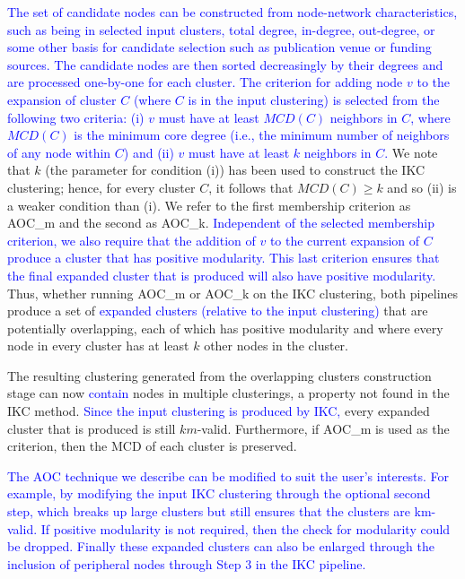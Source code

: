 \documentclass[12pt, oneside]{article}   	%
\begin{document}
\textcolor{blue}{The set of candidate nodes can be constructed from node-network characteristics, such as  being in selected  input clusters,  total degree, in-degree,  out-degree,  or some other basis for candidate selection such as publication venue or funding sources. The candidate nodes are then sorted decreasingly by their degrees and are processed one-by-one for each cluster.
The criterion for adding node $v$ to the expansion of cluster $C$ (where $C$ is in the input clustering) is selected from the following two criteria:
 (i) $v$ must have at least $MCD(C)$ neighbors in  $C$, 
where $MCD(C)$ is the minimum core degree (i.e., the minimum number of neighbors of any node within $C$)  and
(ii) $v$ must have at least $k$ neighbors in  $C$.}
 We note that $k$ (the parameter for condition (i)) has been used to construct the IKC clustering; hence, for every cluster $C$,  it follows that $MCD(C) \geq k$ and so (ii) is a weaker condition than (i). We refer to the first membership criterion as AOC\_m and the second as AOC\_k.
\textcolor{blue}{Independent of the selected membership criterion, we also require that the addition of $v$ to the current expansion of $C$ produce a cluster that has positive modularity.
This last criterion ensures that the final expanded cluster that is produced will also have positive modularity.}
	Thus, whether running   AOC\_m or AOC\_k on the IKC clustering, both pipelines produce a set of  \textcolor{blue}{expanded clusters (relative to the input clustering)} that are potentially overlapping,  each of which has positive modularity and where every node in every cluster has at least $k$ other nodes in the cluster.  
	 	
The resulting clustering generated from the overlapping clusters construction stage can now \textcolor{blue}{contain} nodes in multiple clusterings, a property not found in the IKC method. 
\textcolor{blue}{Since the input clustering is produced by IKC,} every  expanded cluster that is produced is still $km$-valid. Furthermore, if AOC\_m is used as the criterion, then the MCD of each cluster is preserved.

\textcolor{blue}{The AOC technique we describe can be modified to suit the user's interests. For example,   by modifying the input IKC clustering through the optional second step, which breaks  up large clusters but still ensures that the clusters are km-valid.
If positive modularity is not required, then the check for modularity could be dropped.  Finally these expanded clusters can also be enlarged through the inclusion of peripheral nodes through Step 3 in the IKC pipeline.}
\end{document}
